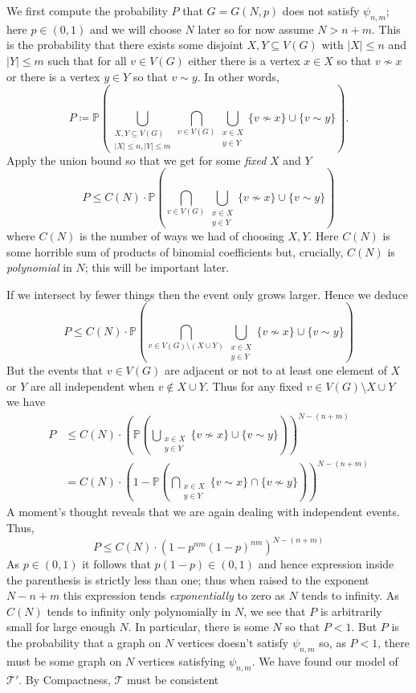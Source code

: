 \documentclass{article}
\begin{document}
\begin{enumerate}[leftmargin=*]
		We first compute the probability $P$ that $G = G(N,p)$ does not satisfy $\psi_{n,m}$; here $p\in (0,1)$ and we will choose $N$ later so for now assume $N> n+m$. This is the probability that there exists some disjoint $X,Y \subseteq V(G)$ with $|X|\leq n$ and $|Y| \leq m$ such that for all $v\in V(G)$ either there is a vertex $x\in X$ so that $v\nsim x$ or there is a vertex $y\in Y$ so that $v\sim y$. In other words,
		\[
			P \coloneqq \mathbb{P}\left(\bigcup_{\substack{X,Y\subseteq V(G)\\ |X|\leq n, |Y|\leq m}} \bigcap_{v\in V(G)} \bigcup_{\substack{x\in X \\ y\in Y}} \{v\nsim x\}\cup \{v\sim y\} \right).
		\]
		Apply the union bound so that we get for some \emph{fixed} $X$ and $Y$
		\[
			P \leq C(N)\cdot\mathbb{P}\left(\bigcap_{v\in V(G)} \bigcup_{\substack{x\in X \\ y\in Y}} \{v\nsim x\}\cup \{v\sim y\}\right)
		\]
		where $C(N)$ is the number of ways we had of choosing $X,Y$. Here $C(N)$ is some horrible sum of products of binomial coefficients but, crucially, $C(N)$ is \emph{polynomial} in $N$; this will be important later.
		
		If we intersect by fewer things then the event only grows larger. Hence we deduce
		\[
		P \leq C(N)\cdot\mathbb{P}\left(\bigcap_{v\in V(G)\setminus(X\cup Y)} \bigcup_{\substack{x\in X \\ y\in Y}} \{v\nsim x\}\cup \{v\sim y\}\right)
		\]
		But the events that $v\in V(G)$ are adjacent or not to at least one element of $X$ or $Y$ are all independent when $v\notin X\cup Y$. Thus for any fixed $v\in V(G)\setminus X\cup Y$ we have
		\begin{align*}
			P &\leq C(N)\cdot \left(\mathbb{P}\left(\bigcup_{\substack{x\in X \\ y\in Y}} \{v\nsim x\}\cup \{v\sim y\}\right)\right)^{N - (n+m)}\\
			&= C(N)\cdot \left(1 - \mathbb{P}\left(\bigcap_{\substack{x\in X \\ y\in Y}} \{v\sim x\}\cap \{v\nsim y\}\right)\right)^{N - (n+m)}
		\end{align*}
		A moment's thought reveals that we are again dealing with independent events. Thus,
		\begin{equation*}
			P \leq C(N)\cdot (1 - p^{nm}(1-p)^{nm})^{N - (n+m)}
		\end{equation*}
		As $p\in(0,1)$ it follows that $p(1-p)\in (0,1)$ and hence expression inside the parenthesis is strictly less than one; thus when raised to the exponent $N - n + m$ this expression tends \emph{exponentially} to zero as $N$ tends to infinity. As $C(N)$ tends to infinity only polynomially in $N$, we see that $P$ is arbitrarily small for large enough $N$. In particular, there is some $N$ so that $P < 1$. But $P$ is the probability that a graph on $N$ vertices doesn't satisfy $\psi_{n,m}$ so, as $P<1$, there must be some graph on $N$ vertices satisfying $\psi_{n,m}$. We have found our model of $\mathcal{T}'$.	By Compactness, $\mathcal{T}$ must be consistent
		

\end{enumerate}
\end{document}
